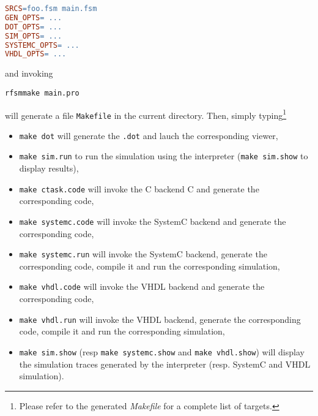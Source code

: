 \begin{lstlisting}[language=make,frame=single]
SRCS=foo.fsm main.fsm
GEN_OPTS= ...
DOT_OPTS= ...
SIM_OPTS= ...
SYSTEMC_OPTS= ...
VHDL_OPTS= ...
\end{lstlisting}

\noindent
and invoking

\begin{verbatim}
rfsmmake main.pro
\end{verbatim}

\noindent
will generate a file \verb|Makefile| in the current directory. 
Then, simply typing\footnote{Please refer to the generated \emph{Makefile} for
  a complete list of targets.}
  \begin{itemize}
  \item \verb|make dot| will generate the \verb|.dot| and lauch the corresponding viewer,
  \item \verb|make sim.run| to run the simulation using the interpreter (\verb|make sim.show| to display results),
  \item \verb|make ctask.code| will invoke the C backend C and generate the corresponding code,
  \item \verb|make systemc.code| will invoke the SystemC backend  and generate the corresponding code,
  \item \verb|make systemc.run| will invoke the SystemC backend, generate the corresponding
    code, compile it and run the corresponding simulation,
  \item \verb|make vhdl.code| will invoke the VHDL backend  and generate the corresponding code,
  \item \verb|make vhdl.run| will invoke the VHDL backend, generate the corresponding
    code, compile it and run the corresponding simulation,
  \item \verb|make sim.show| (resp \verb|make systemc.show| and \verb|make vhdl.show|) will display
    the simulation traces generated by the interpreter (resp. SystemC and VHDL simulation).
  \end{itemize}



